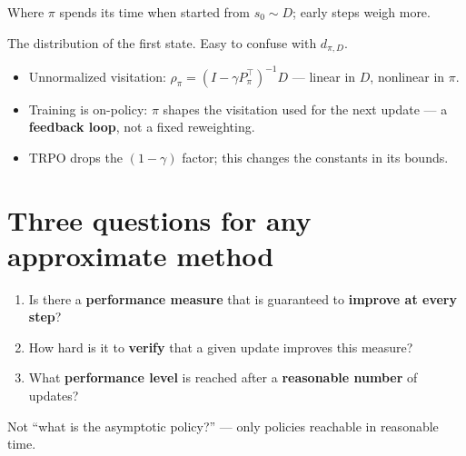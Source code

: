 \begin{pair}
\begin{coolbox}[title={$d_{\pi,D}$: the whole trajectory}]
\small Where $\pi$ spends its time when started from $s_0\sim D$; early steps weigh more.
\end{coolbox}
\begin{warmbox}[title={$D$: only $s_0$}]
\small The distribution of the first state. Easy to confuse with $d_{\pi,D}$.
\end{warmbox}
\end{pair}

\begin{notebox}
\begin{itemize}[leftmargin=*]
  \item Unnormalized visitation: $\rho_\pi=(I-\gamma P_\pi^\top)^{-1}D$ --- linear in $D$, nonlinear in $\pi$.
  \item Training is on-policy: $\pi$ shapes the visitation used for the next update --- a \textbf{feedback loop}, not a fixed reweighting.
  \item TRPO drops the $(1-\gamma)$ factor; this changes the constants in its bounds.
\end{itemize}
\end{notebox}

\section{Three questions for any approximate method}

\begin{tcolorbox}[notes, colback=GoodGreen!5, colframe=GoodGreen, colbacktitle=GoodGreen, title={The three questions (K\&L Sec.~3)}]
\begin{enumerate}[label=\textbf{Q\arabic*}]
  \item Is there a \textbf{performance measure} that is guaranteed to \textbf{improve at every step}?
  \item How hard is it to \textbf{verify} that a given update improves this measure?
  \item What \textbf{performance level} is reached after a \textbf{reasonable number} of updates?
\end{enumerate}
\end{tcolorbox}

{\small Not ``what is the asymptotic policy?'' --- only policies reachable in reasonable time.}

